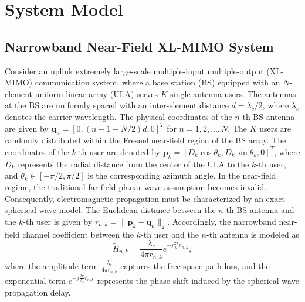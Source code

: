\section{System Model}

\subsection{Narrowband Near-Field XL-MIMO System}
Consider an uplink extremely large-scale multiple-input multiple-output (XL-MIMO) communication system, where a base station (BS) equipped with an $N$-element uniform linear array (ULA) serves $K$ single-antenna users. The antennas at the BS are uniformly spaced with an inter-element distance $d = \lambda_c / 2$, where $\lambda_c$ denotes the carrier wavelength. The physical coordinates of the $n$-th BS antenna are given by $\mathbf{q}_n = [0, (n - 1 - N/2)d, 0]^T$ for $n = 1, 2, \dots, N$. The $K$ users are randomly distributed within the Fresnel near-field region of the BS array. The coordinates of the $k$-th user are denoted by $\mathbf{p}_k = [D_k \cos\theta_k, D_k \sin\theta_k, 0]^T$, where $D_k$ represents the radial distance from the center of the ULA to the $k$-th user, and $\theta_k \in [-\pi/2, \pi/2]$ is the corresponding azimuth angle. In the near-field regime, the traditional far-field planar wave assumption becomes invalid. Consequently, electromagnetic propagation must be characterized by an exact spherical wave model. The Euclidean distance between the $n$-th BS antenna and the $k$-th user is given by $r_{n,k} = \|\mathbf{p}_k - \mathbf{q}_n\|_2$. Accordingly, the narrowband near-field channel coefficient between the $k$-th user and the $n$-th antenna is modeled as
\begin{equation}
    \tilde{H}_{n,k} = \frac{\lambda_c}{4\pi r_{n,k}} e^{-j \frac{2\pi}{\lambda_c} r_{n,k}},
\end{equation}
where the amplitude term $\frac{\lambda_c}{4\pi r_{n,k}}$ captures the free-space path loss, and the exponential term $e^{-j \frac{2\pi}{\lambda_c} r_{n,k}}$ represents the phase shift induced by the spherical wave propagation delay.

